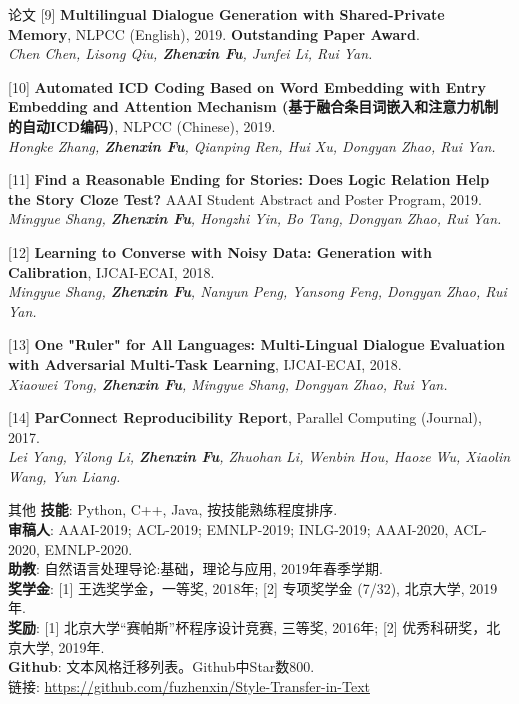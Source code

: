 \documentclass{resume} %
\begin{document}
\begin{rSection}{论文}
    [9] \textbf{Multilingual Dialogue Generation with Shared-Private Memory}, NLPCC (English), 2019. \textbf{Outstanding Paper Award}. \\
    {\it Chen Chen, Lisong Qiu, \textbf{Zhenxin Fu}, Junfei Li, Rui Yan. }

    [10] \textbf{Automated ICD Coding Based on Word Embedding with Entry Embedding and Attention Mechanism (基于融合条目词嵌入和注意力机制的自动ICD编码)}, NLPCC (Chinese), 2019. \\
    {\it Hongke Zhang, \textbf{Zhenxin Fu}, Qianping Ren, Hui Xu, Dongyan Zhao, Rui Yan.}

    [11] \textbf{Find a Reasonable Ending for Stories: Does Logic Relation Help the Story Cloze Test?} AAAI Student Abstract and Poster Program, 2019. \\
    {\it Mingyue Shang, \textbf{Zhenxin Fu}, Hongzhi Yin, Bo Tang, Dongyan Zhao, Rui Yan.}

    [12] \textbf{Learning to Converse with Noisy Data: Generation with Calibration}, IJCAI-ECAI, 2018. \\
    {\it Mingyue Shang, \textbf{Zhenxin Fu}, Nanyun Peng, Yansong Feng, Dongyan Zhao, Rui Yan.} 

    [13] \textbf{One "Ruler" for All Languages: Multi-Lingual Dialogue Evaluation with Adversarial Multi-Task Learning}, IJCAI-ECAI, 2018. \\
    {\it Xiaowei Tong, \textbf{Zhenxin Fu}, Mingyue Shang, Dongyan Zhao, Rui Yan.}

    [14] \textbf{ParConnect Reproducibility Report}, Parallel Computing (Journal), 2017.\\
    {\it Lei Yang, Yilong Li, \textbf{Zhenxin Fu}, Zhuohan Li, Wenbin Hou, Haoze Wu, Xiaolin Wang, Yun Liang.}
    
\end{rSection}
    
    
\begin{rSection}{其他}
    \textbf{技能}: Python, C++, Java, 按技能熟练程度排序. \\
    \textbf{审稿人}: AAAI-2019; ACL-2019; EMNLP-2019; INLG-2019; AAAI-2020, ACL-2020, EMNLP-2020. \\
    \textbf{助教}: 自然语言处理导论:基础，理论与应用, 2019年春季学期. \\
    \textbf{奖学金}: [1] 王选奖学金，一等奖, 2018年; [2] 专项奖学金 (7/32), 北京大学, 2019年. \\
    \textbf{奖励}: [1] 北京大学``赛帕斯''杯程序设计竞赛, 三等奖, 2016年; [2] 优秀科研奖，北京大学, 2019年. \\
    \textbf{Github}: 文本风格迁移列表。Github中Star数800. \\链接: \url{https://github.com/fuzhenxin/Style-Transfer-in-Text}
\end{rSection}
\end{document}
